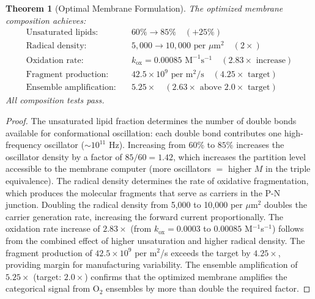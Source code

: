 \documentclass[twocolumn,10pt,a4paper]{article}
\newtheorem{theorem}{Theorem}[section]
\theoremstyle{definition}
\theoremstyle{remark}
\begin{document}
\begin{theorem}[Optimal Membrane Formulation]
\label{thm:composition}
The optimized membrane composition achieves:
\begin{align}
\text{Unsaturated lipids:} &\quad 60\% \to 85\% \quad (+25\%) \label{eq:unsaturated} \\
\text{Radical density:} &\quad 5{,}000 \to 10{,}000 \text{ per } \mu\text{m}^2 \quad (2\times) \label{eq:radical} \\
\text{Oxidation rate:} &\quad k_{\mathrm{ox}} = 0.00085 \text{ M}^{-1}\text{s}^{-1} \quad (2.83\times \text{ increase}) \label{eq:oxidation} \\
\text{Fragment production:} &\quad 42.5 \times 10^9 \text{ per m}^2/\text{s} \quad (4.25\times \text{ target}) \label{eq:fragments} \\
\text{Ensemble amplification:} &\quad 5.25\times \quad (2.63\times \text{ above } 2.0\times \text{ target}) \label{eq:amplification}
\end{align}
All composition tests pass.
\end{theorem}

\begin{proof}
The unsaturated lipid fraction determines the number of double bonds available for conformational oscillation: each double bond contributes one high-frequency oscillator ($\sim 10^{11}$ Hz). Increasing from $60\%$ to $85\%$ increases the oscillator density by a factor of $85/60 = 1.42$, which increases the partition level accessible to the membrane computer (more oscillators $=$ higher $M$ in the triple equivalence). The radical density determines the rate of oxidative fragmentation, which produces the molecular fragments that serve as carriers in the P-N junction. Doubling the radical density from 5,000 to 10,000 per $\mu$m$^2$ doubles the carrier generation rate, increasing the forward current proportionally. The oxidation rate increase of $2.83\times$ (from $k_{\mathrm{ox}} = 0.0003$ to $0.00085$ M$^{-1}$s$^{-1}$) follows from the combined effect of higher unsaturation and higher radical density. The fragment production of $42.5 \times 10^9$ per m$^2$/s exceeds the target by $4.25\times$, providing margin for manufacturing variability. The ensemble amplification of $5.25\times$ (target: $2.0\times$) confirms that the optimized membrane amplifies the categorical signal from O$_2$ ensembles by more than double the required factor. \qedhere
\end{proof}
\end{document}
